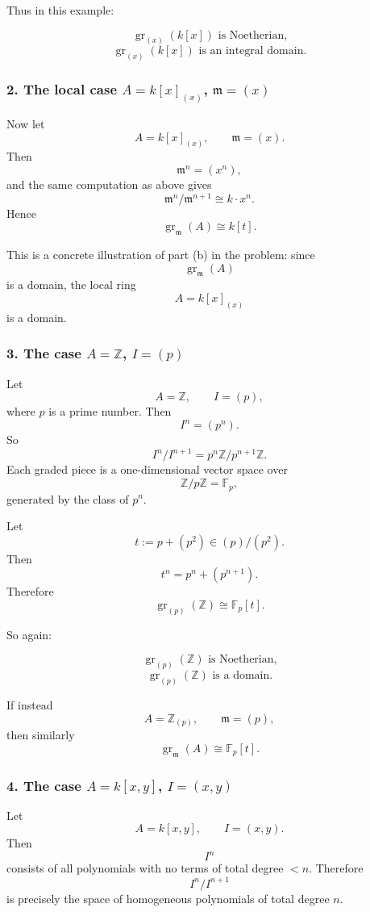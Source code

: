 \documentclass[12pt,a4paper]{article}
\theoremstyle{notespace}
\theoremstyle{definition}
\begin{document}
Thus in this example:

\[
\operatorname{gr}_{(x)}(k[x]) \text{ is Noetherian,}
\]
\[
\operatorname{gr}_{(x)}(k[x]) \text{ is an integral domain.}
\]

\subsubsection{2. The local case \(A=k[x]_{(x)}\), \(\mathfrak m=(x)\)}

Now let
\[
A=k[x]_{(x)},
\qquad
\mathfrak m=(x).
\]
Then
\[
\mathfrak m^n=(x^n),
\]
and the same computation as above gives
\[
\mathfrak m^n/\mathfrak m^{n+1}\cong k\cdot x^n.
\]
Hence
\[
\operatorname{gr}_{\mathfrak m}(A)\cong k[t].
\]

This is a concrete illustration of part (b) in the problem: since
\[
\operatorname{gr}_{\mathfrak m}(A)
\]
is a domain, the local ring
\[
A=k[x]_{(x)}
\]
is a domain.

\subsubsection{3. The case \(A=\mathbb Z\), \(I=(p)\)}

Let
\[
A=\mathbb Z,
\qquad
I=(p),
\]
where \(p\) is a prime number. Then
\[
I^n=(p^n).
\]
So
\[
I^n/I^{n+1}=p^n\mathbb Z/p^{n+1}\mathbb Z.
\]
Each graded piece is a one-dimensional vector space over
\[
\mathbb Z/p\mathbb Z=\mathbb F_p,
\]
generated by the class of \(p^n\).

Let
\[
t:=p+(p^2)\in (p)/(p^2).
\]
Then
\[
t^n=p^n+(p^{n+1}).
\]
Therefore
\[
\operatorname{gr}_{(p)}(\mathbb Z)\cong \mathbb F_p[t].
\]

So again:

\[
\operatorname{gr}_{(p)}(\mathbb Z) \text{ is Noetherian,}
\]
\[
\operatorname{gr}_{(p)}(\mathbb Z) \text{ is a domain.}
\]

If instead
\[
A=\mathbb Z_{(p)},
\qquad
\mathfrak m=(p),
\]
then similarly
\[
\operatorname{gr}_{\mathfrak m}(A)\cong \mathbb F_p[t].
\]

\subsubsection{4. The case \(A=k[x,y]\), \(I=(x,y)\)}

Let
\[
A=k[x,y],
\qquad
I=(x,y).
\]
Then
\[
I^n
\]
consists of all polynomials with no terms of total degree \(<n\). Therefore
\[
I^n/I^{n+1}
\]
is precisely the space of homogeneous polynomials of total degree \(n\).
\end{document}
